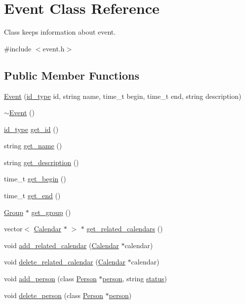 \hypertarget{classEvent}{
\section{Event Class Reference}
\label{d5/da5/classEvent}
}


Class keeps information about event.  




{\ttfamily \#include $<$event.h$>$}

\subsection*{Public Member Functions}
\begin{DoxyCompactItemize}
\item 
\hyperlink{classEvent_a150a1c9476acae579c6664d8736a59c1}{Event} (\hyperlink{types_8h_a0b60c08a3ab1435cccc5643d32d8ccee}{id\_\-type} id, string name, time\_\-t begin, time\_\-t end, string description)
\item 
\hyperlink{classEvent_a7704ec01ce91e673885792054214b3d2}{$\sim$Event} ()
\item 
\hyperlink{types_8h_a0b60c08a3ab1435cccc5643d32d8ccee}{id\_\-type} \hyperlink{classEvent_aa82316746fdf73be1da9b5b8840f5e2d}{get\_\-id} ()
\item 
string \hyperlink{classEvent_a99325a5304e3b73cd4df1f356a185cfc}{get\_\-name} ()
\item 
string \hyperlink{classEvent_a07fdb4a55424b028bfb64db3cea94c07}{get\_\-description} ()
\item 
time\_\-t \hyperlink{classEvent_aa0177bde2838d761774f6e9a50f1e76c}{get\_\-begin} ()
\item 
time\_\-t \hyperlink{classEvent_a25baaf84cc87da4b866f266f946c1d8f}{get\_\-end} ()
\item 
\hyperlink{classGroup}{Group} $\ast$ \hyperlink{classEvent_a5736ec29101416a0358b709c964bf50d}{get\_\-group} ()
\item 
vector$<$ \hyperlink{classCalendar}{Calendar} $\ast$ $>$ $\ast$ \hyperlink{classEvent_ab2329f2021caee686920d5ab2cfa8569}{get\_\-related\_\-calendars} ()
\item 
void \hyperlink{classEvent_a1d59dc31b3358bb9d9d1e75cb735c6ef}{add\_\-related\_\-calendar} (\hyperlink{classCalendar}{Calendar} $\ast$calendar)
\item 
void \hyperlink{classEvent_ac4bc91dab8ca340c58aed7c91a8376a7}{delete\_\-related\_\-calendar} (\hyperlink{classCalendar}{Calendar} $\ast$calendar)
\item 
void \hyperlink{classEvent_a77077d8d27027113b2e20b4374a00a61}{add\_\-person} (class \hyperlink{classPerson}{Person} $\ast$\hyperlink{group__content_8h_ab8664e6fd42f01eeaad084b5e20eb54e}{person}, string \hyperlink{group__content_8h_ab4d38e7365d935f2a5f1403eec29127e}{status})
\item 
void \hyperlink{classEvent_a5e071ee79b9ac9520fa5f26d763ce662}{delete\_\-person} (class \hyperlink{classPerson}{Person} $\ast$\hyperlink{group__content_8h_ab8664e6fd42f01eeaad084b5e20eb54e}{person})
\end{DoxyCompactItemize}


